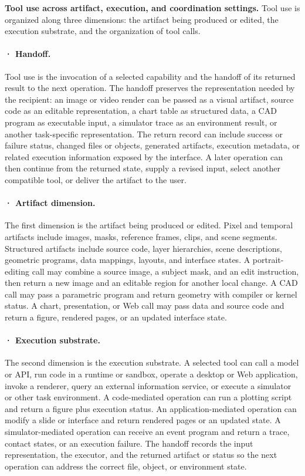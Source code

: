 \textbf{Tool use across artifact, execution, and coordination settings.} Tool use is organized along three dimensions: the artifact being produced or edited, the execution substrate, and the organization of tool calls.

\paragraph{· Handoff.} Tool use is the invocation of a selected capability and the handoff of its returned result to the next operation. The handoff preserves the representation needed by the recipient: an image or video render can be passed as a visual artifact, source code as an editable representation, a chart table as structured data, a CAD program as executable input, a simulator trace as an environment result, or another task-specific representation. The return record can include success or failure status, changed files or objects, generated artifacts, execution metadata, or related execution information exposed by the interface. A later operation can then continue from the returned state, supply a revised input, select another compatible tool, or deliver the artifact to the user.

\paragraph{· Artifact dimension.} The first dimension is the artifact being produced or edited. Pixel and temporal artifacts include images, masks, reference frames, clips, and scene segments. Structured artifacts include source code, layer hierarchies, scene descriptions, geometric programs, data mappings, layouts, and interface states. A portrait-editing call may combine a source image, a subject mask, and an edit instruction, then return a new image and an editable region for another local change. A CAD call may pass a parametric program and return geometry with compiler or kernel status. A chart, presentation, or Web call may pass data and source code and return a figure, rendered pages, or an updated interface state.

\paragraph{· Execution substrate.} The second dimension is the execution substrate. A selected tool can call a model or API, run code in a runtime or sandbox, operate a desktop or Web application, invoke a renderer, query an external information service, or execute a simulator or other task environment. A code-mediated operation can run a plotting script and return a figure plus execution status. An application-mediated operation can modify a slide or interface and return rendered pages or an updated state. A simulator-mediated operation can receive an event program and return a trace, contact states, or an execution failure. The handoff records the input representation, the executor, and the returned artifact or status so the next operation can address the correct file, object, or environment state.

